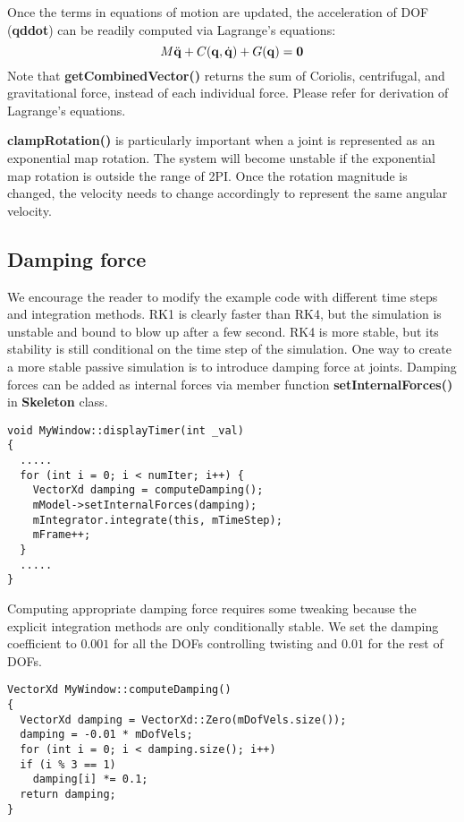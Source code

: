 Once the terms in equations of motion are updated, the acceleration of
DOF (\textbf{qddot}) can be readily computed via Lagrange's equations:
\begin{equation}
M \ddot{\mathbf{q}} + C(\mathbf{q}, \dot{\mathbf{q}}) + G(\mathbf{q}) = \mathbf{0}
\end{equation}
Note that \textbf{getCombinedVector()} returns the sum of Coriolis,
centrifugal, and gravitational force, instead of each individual
force. Please refer \cite{dynamic-tutorial} for derivation of
Lagrange's equations.

\textbf{clampRotation()} is particularly important when a joint is
represented as an exponential map rotation. The system will become
unstable if the exponential map rotation is outside the range of
2PI. Once the rotation magnitude is changed, the velocity needs to
change accordingly to represent the same angular velocity.

\subsection{Damping force}
We encourage the reader to modify the example code with different time
steps and integration methods. RK1 is clearly faster than RK4, but the
simulation is unstable and bound to blow up after a few second. RK4 is
more stable, but its stability is still conditional on the time step
of the simulation. One way to create a more stable passive simulation
is to introduce damping force at joints. Damping forces can be added
as internal forces via member function \textbf{setInternalForces()} in
\textbf{Skeleton} class. 

\ttfamily
\begin{lstlisting}[caption=MyWindow.cpp]
void MyWindow::displayTimer(int _val)
{
  .....
  for (int i = 0; i < numIter; i++) {
    VectorXd damping = computeDamping();
    mModel->setInternalForces(damping);
    mIntegrator.integrate(this, mTimeStep);
    mFrame++;
  }
  .....
}
\end{lstlisting}
\rmfamily

Computing appropriate damping force requires some tweaking because the
explicit integration methods are only conditionally stable. We set the
damping coefficient to $0.001$ for all the DOFs controlling twisting
and $0.01$ for the rest of DOFs.

\ttfamily
\begin{lstlisting}[caption=MyWindow.cpp]
VectorXd MyWindow::computeDamping()
{
  VectorXd damping = VectorXd::Zero(mDofVels.size());
  damping = -0.01 * mDofVels;
  for (int i = 0; i < damping.size(); i++)
  if (i % 3 == 1)
    damping[i] *= 0.1;
  return damping;
}
\end{lstlisting}
\rmfamily
